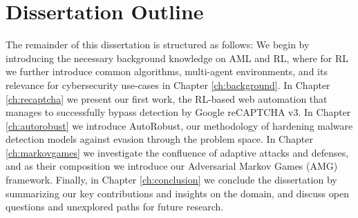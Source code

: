 
\section{Dissertation Outline}

The remainder of this dissertation is structured as follows:
We begin by introducing the necessary background knowledge on \gls{AML} and \gls{RL}, where for \gls{RL} we further introduce common algorithms, multi-agent environments, and its relevance for cybersecurity use-cases in Chapter \ref{ch:background}.
In Chapter \ref{ch:recaptcha} we present our first work, the RL-based web automation that manages to successfully bypass detection by Google reCAPTCHA v3.
In Chapter \ref{ch:autorobust} we introduce AutoRobust, our methodology of hardening malware detection models against evasion through the problem space.
In Chapter \ref{ch:markovgames} we investigate the confluence of adaptive attacks and defenses, and as their composition we introduce our Adversarial Markov Games (AMG) framework. 
Finally, in Chapter \ref{ch:conclusion} we conclude the dissertation by summarizing our key contributions and insights on the domain, and discuss open questions and unexplored paths for future research.

\cleardoublepage

